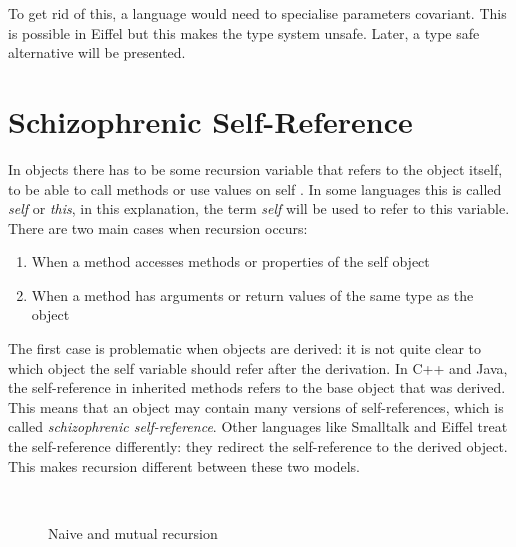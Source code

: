 To get rid of this, a language would need to specialise parameters
covariant. This is possible in Eiffel but this makes the type system
unsafe. Later, a type safe alternative will be presented.

\section{Schizophrenic Self-Reference}
\label{sec:schizoReferences}

In objects there has to be some recursion variable that refers to the
object itself, to be able to call methods or use values on self . In some
languages this is called \emph{self} or \emph{this}, in this explanation,
the term \emph{self} will be used to refer to this variable. \\

There are two main cases when recursion occurs:
\begin{enumerate}
\item When a method accesses methods or properties of the self object
\item When a method has arguments or return values of the same type as the object
\end{enumerate}

The first case is problematic when objects are derived: it is not quite
clear to which object the self variable should refer after the derivation.
In C++ and Java, the self-reference in inherited methods refers to
the base object that was derived. This means that an object may contain
many versions of self-references, which is called \emph{schizophrenic
self-reference}. Other languages like Smalltalk and Eiffel treat the
self-reference differently: they redirect the self-reference to the
derived object. This makes recursion different between these two models.

\begin{figure}
	\centering
	\\
	\caption{Naive and mutual recursion}
	\label{fig:schizoRecursion}
\end{figure}

